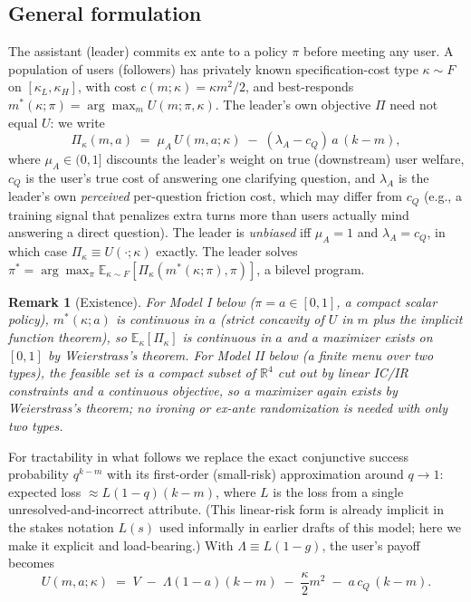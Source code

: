 \documentclass[11pt]{article}
\newtheorem{remark}{Remark}
\begin{document}
\subsection{General formulation}

The assistant (leader) commits ex ante to a policy $\pi$ before meeting any user.
A population of users (followers) has privately known specification-cost type
$\kappa \sim F$ on $[\kappa_L,\kappa_H]$, with cost $c(m;\kappa)=\kappa m^2/2$, and
best-responds $m^*(\kappa;\pi) = \arg\max_m U(m;\pi,\kappa)$. The leader's own
objective $\Pi$ need not equal $U$: we write
\[
\Pi_\kappa(m,a) \;=\; \mu_A\, U(m,a;\kappa) \;-\; (\lambda_A - c_Q)\, a\,(k-m),
\]
where $\mu_A \in (0,1]$ discounts the leader's weight on true (downstream) user
welfare, $c_Q$ is the user's true cost of answering one clarifying question, and
$\lambda_A$ is the leader's own \emph{perceived} per-question friction cost, which
may differ from $c_Q$ (e.g., a training signal that penalizes extra turns more
than users actually mind answering a direct question). The leader is
\emph{unbiased} iff $\mu_A=1$ and $\lambda_A=c_Q$, in which case $\Pi_\kappa \equiv
U(\cdot;\kappa)$ exactly. The leader solves
$\pi^* = \arg\max_\pi \mathbb{E}_{\kappa\sim F}[\Pi_\kappa(m^*(\kappa;\pi),\pi)]$,
a bilevel program.

\begin{remark}[Existence]
For Model I below ($\pi=a\in[0,1]$, a compact scalar policy), $m^*(\kappa;a)$ is
continuous in $a$ (strict concavity of $U$ in $m$ plus the implicit function
theorem), so $\mathbb{E}_\kappa[\Pi_\kappa]$ is continuous in $a$ and a maximizer
exists on $[0,1]$ by Weierstrass's theorem. For Model II below (a finite menu over
two types), the feasible set is a compact subset of $\mathbb{R}^4$ cut out by
linear IC/IR constraints and a continuous objective, so a maximizer again exists
by Weierstrass's theorem; no ironing or ex-ante randomization is needed with only
two types.
\end{remark}

For tractability in what follows we replace the exact conjunctive success
probability $q^{k-m}$ with its first-order (small-risk) approximation around
$q\to 1$: expected loss $\approx L(1-q)(k-m)$, where $L$ is the loss from a single
unresolved-and-incorrect attribute. (This linear-risk form is already implicit in
the stakes notation $L(s)$ used informally in earlier drafts of this model; here we
make it explicit and load-bearing.) With $\Lambda \equiv L(1-g)$, the user's payoff
becomes
\[
U(m,a;\kappa) \;=\; V \;-\; \Lambda(1-a)(k-m) \;-\; \frac{\kappa}{2}m^2 \;-\; a\,c_Q\,(k-m).
\]
\end{document}
